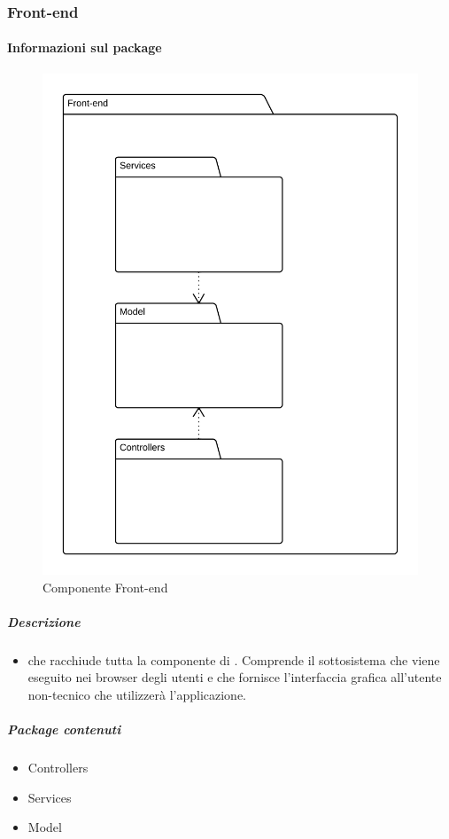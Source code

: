 
  \subsubsection{Front-end}
  \paragraph{Informazioni sul package}
    \begin{figure}[H] 
      \begin{center} 
        \includegraphics[width=\textwidth]{uml/package/Front-end.png}  
        \caption{Componente Front-end}
      \end{center}  
    \end{figure} 
  \subparagraph{Descrizione} 
    \begin{itemize}
    \item[]  che racchiude tutta la componente di . Comprende il sottosistema che viene eseguito nei browser degli utenti e che fornisce l'interfaccia grafica all'utente non-tecnico che utilizzerà l'applicazione.
    \end{itemize} 
    \subparagraph{Package contenuti} 
    \begin{itemize}
        \item Controllers
        \item Services
        \item Model
    \end{itemize}

